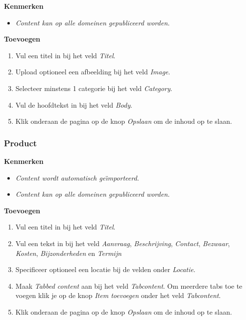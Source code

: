 \textbf{Kenmerken}

\begin{itemize}
\item \emph{Content kan op alle domeinen gepubliceerd worden.}
\end{itemize}

\textbf{Toevoegen}

\begin{enumerate}
\item Vul een titel in bij het veld \emph{Titel}.
\item Upload optioneel een afbeelding bij het veld \emph{Image}.
\item Selecteer minstens 1 categorie bij het veld \emph{Category}.
\item Vul de hoofdtekst in bij het veld \emph{Body}.
\item Klik onderaan de pagina op de knop \emph{Opslaan} om de inhoud op te slaan.
\end{enumerate}

\subsubsection{Product}\label{product}

\textbf{Kenmerken}

\begin{itemize}
\item \emph{Content wordt automatisch ge{\"\i}mporteerd.}
\item \emph{Content kan op alle domeinen gepubliceerd worden.}
\end{itemize}

\textbf{Toevoegen}

\begin{enumerate}
\item Vul een titel in bij het veld \emph{Titel}.
\item Vul een tekst in bij het veld \emph{Aanvraag}, \emph{Beschrijving}, \emph{Contact}, \emph{Bezwaar}, \emph{Kosten}, \emph{Bijzonderheden} en \emph{Termijn}
\item Specificeer optioneel een locatie bij de velden onder \emph{Locatie}.
\item Maak \emph{Tabbed content} aan bij het veld \emph{Tabcontent}. Om meerdere tabs toe te voegen klik je op de knop \emph{Item toevoegen} onder het veld \emph{Tabcontent}.
\item Klik onderaan de pagina op de knop \emph{Opslaan} om de inhoud op te slaan.
\end{enumerate}

